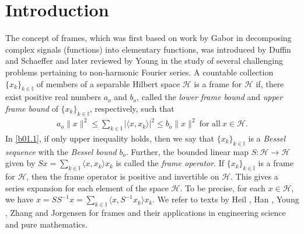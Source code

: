 \documentclass[reqno]{amsart}
\theoremstyle{plain}
\theoremstyle{remark}
\numberwithin{equation}{section}
\begin{document}
\section{Introduction}
The concept of frames, which was first based on work by Gabor \cite{G46} in decomposing complex signals (functions) into elementary functions, was introduced by Duffin and Schaeffer \cite{DS} and later reviewed by Young \cite{Young} in the study of several challenging problems pertaining to non-harmonic Fourier series. A countable collection  $\{x_k\}_{k \in \mathbb{I}}$ of members of a  separable Hilbert space $\mathcal{H}$ is a frame for $\mathcal{H}$ if, there exist positive real numbers $a_o$ and $b_o$, called the \emph{lower frame bound} and \emph{upper frame bound} of $\{x_k\}_{k \in \mathbb{I}}$,  respectively,  such that
\begin{align}\label{b01.1}
a_o \|x\|^2\leq  \sum_{k \in \mathbb{I}}|\langle x, x_k\rangle|^2 \leq b_o \|x\|^2 \ \text{for all} \ x \in \mathcal{H}.
\end{align}
In \eqref{b01.1}, if only upper inequality holds, then we say that $\{x_k\}_{k \in \mathbb{I} }$   is  a \emph{Bessel sequence} with the \emph{Bessel bound} $b_o$. Further, the bounded linear map $S: \mathcal{H} \rightarrow \mathcal{H}$   given by $Sx = \sum_{k \in \mathbb{I}}\langle x, x_k\rangle x_k$ is called the \emph{frame operator}. If $\{x_k\}_{k \in \mathbb{I} }$ is a frame for $\mathcal{H}$, then the frame operator is positive and invertible on $\mathcal{H}$. This gives a series expansion for each element of the space $\mathcal{H}$. To be precise, for each $x \in \mathcal{H}$, we have $x = SS^{-1}x =\sum_{k \in \mathbb{I}} \langle x, S^{-1}x_k \rangle x_k$. We refer to texts  by Heil \cite{H11}, Han \cite{BHan}, Young \cite{Young}, Zhang and Jorgensen  \cite{Zpelle}  for frames and their applications in engineering science and pure mathematics.
\end{document}
